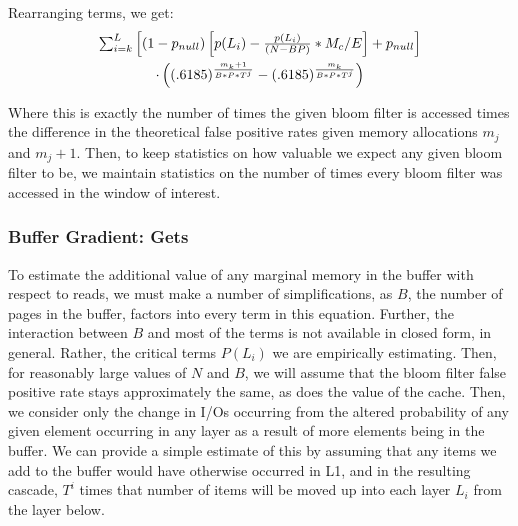 \documentclass{cidr-2019}
\begin{document}
Rearranging terms, we get:
\begin{multline}
$$\sum_{i=k}^{L} \left[(1-p_{null})\left[p(L_i) - \frac{p(L_i)}{(N - BP)} * M_c/E \right] +  p_{null} \right] \\ \cdot \left( (.6185) ^  {\frac{m_k+1}{B*P*T^j}} - (.6185) ^  {\frac{m_k}{B*P*T^j}}\right)$$
\end{multline}

Where this is exactly the number of times the given bloom filter is accessed
times the difference in the theoretical false positive rates given memory
allocations $m_j$ and $m_j+1$. Then, to keep statistics on how valuable we
expect any given bloom filter to be, we maintain statistics on the number of
times every bloom filter was accessed in the window of interest.

\subsubsection{Buffer Gradient: Gets}

To estimate the additional value of any marginal memory in the buffer with
respect to reads, we must make a number of simplifications, as $B$, the number
of pages in the buffer, factors into every term in this equation. Further, the
interaction between $B$ and most of the terms is not available in closed form,
in general. Rather, the critical terms $P(L_i)$ we are empirically estimating.
Then, for reasonably large values of $N$ and $B$, we will assume that the bloom
filter false positive rate stays approximately the same, as does the value of
the cache. Then, we consider only the change in I/Os occurring from the altered
probability of any given element occurring in any layer as a result of more
elements being in the buffer. We can provide a simple estimate
of this by assuming that any items we add to the buffer would have
otherwise occurred in L1, and in the resulting cascade, $T^{i}$ times that number of items will be moved up into 
each layer $L_{i}$ from the layer below.
\end{document}
